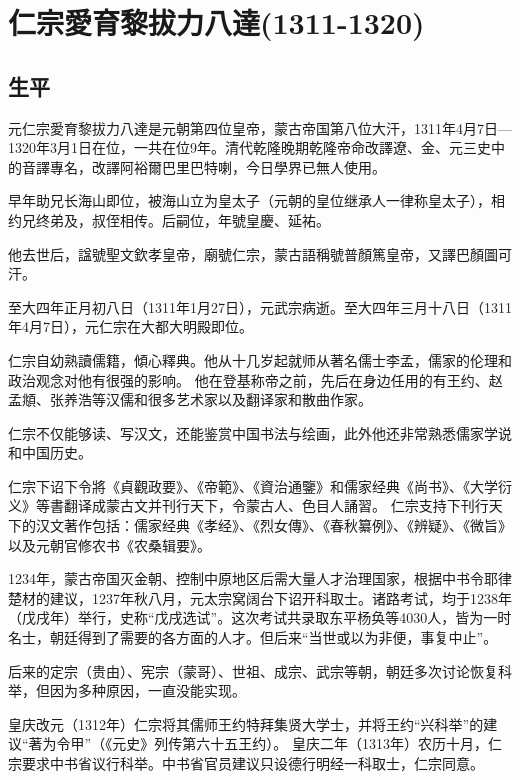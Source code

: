 
\section{仁宗愛育黎拔力八達\tiny(1311-1320)}

\subsection{生平}

元仁宗愛育黎拔力八達是元朝第四位皇帝，蒙古帝国第八位大汗，1311年4月7日—1320年3月1日在位，一共在位9年。清代乾隆晚期乾隆帝命改譯遼、金、元三史中的音譯專名，改譯阿裕爾巴里巴特喇，今日學界已無人使用。

早年助兄长海山即位，被海山立为皇太子（元朝的皇位继承人一律称皇太子），相约兄终弟及，叔侄相传。后嗣位，年號皇慶、延祐。

他去世后，諡號聖文欽孝皇帝，廟號仁宗，蒙古語稱號普顏篤皇帝，又譯巴顏圖可汗。

至大四年正月初八日（1311年1月27日），元武宗病逝。至大四年三月十八日（1311年4月7日），元仁宗在大都大明殿即位。

仁宗自幼熟讀儒籍，傾心釋典。他从十几岁起就师从著名儒士李孟，儒家的伦理和政治观念对他有很强的影响。 他在登基称帝之前，先后在身边任用的有王约、赵孟頫、张养浩等汉儒和很多艺术家以及翻译家和散曲作家。

仁宗不仅能够读、写汉文，还能鉴赏中国书法与绘画，此外他还非常熟悉儒家学说和中国历史。

仁宗下诏下令將《貞觀政要》、《帝範》、《資治通鑒》和儒家经典《尚书》、《大学衍义》等書翻译成蒙古文并刊行天下，令蒙古人、色目人誦習。 仁宗支持下刊行天下的汉文著作包括：儒家经典《孝经》、《烈女傳》、《春秋纂例》、《辨疑》、《微旨》以及元朝官修农书《农桑辑要》。

1234年，蒙古帝国灭金朝、控制中原地区后需大量人才治理国家，根据中书令耶律楚材的建议，1237年秋八月，元太宗窝阔台下诏开科取士。诸路考试，均于1238年（戊戌年）举行，史称“戊戌选试”。这次考试共录取东平杨奂等4030人，皆为一时名士，朝廷得到了需要的各方面的人才。但后来“当世或以为非便，事复中止”。

后来的定宗（贵由）、宪宗（蒙哥）、世祖、成宗、武宗等朝，朝廷多次讨论恢复科举，但因为多种原因，一直没能实现。

皇庆改元（1312年）仁宗将其儒师王约特拜集贤大学士，并将王约“兴科举”的建议“著为令甲”（《元史》列传第六十五王约）。 皇庆二年（1313年）农历十月，仁宗要求中书省议行科举。中书省官员建议只设德行明经一科取士，仁宗同意。

